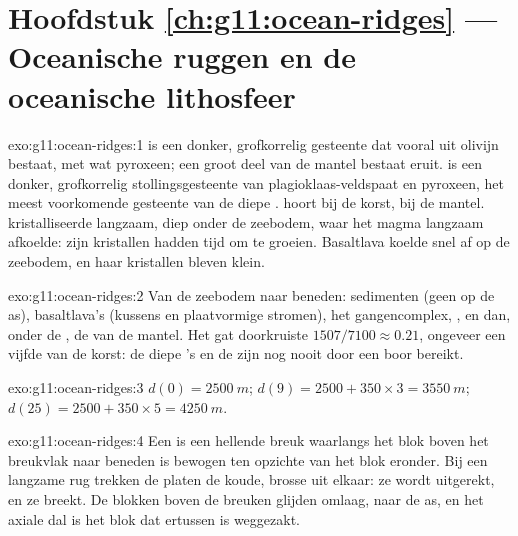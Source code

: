 \section*{Hoofdstuk \ref{ch:g11:ocean-ridges} --- Oceanische ruggen en de oceanische lithosfeer}

\begin{solution}{exo:g11:ocean-ridges:1}
 is een donker, grofkorrelig gesteente dat vooral uit olivijn bestaat, met
wat pyroxeen; een groot deel van de mantel bestaat eruit.  is een donker,
grofkorrelig stollingsgesteente van plagioklaas-veldspaat en pyroxeen, het meest
voorkomende gesteente van de diepe .  hoort bij de korst,
 bij de mantel.  kristalliseerde langzaam, diep onder de zeebodem,
waar het magma langzaam afkoelde: zijn kristallen hadden tijd om te groeien.
Basaltlava koelde snel af op de zeebodem, en haar kristallen bleven klein.
\end{solution}

\begin{solution}{exo:g11:ocean-ridges:2}
Van de zeebodem naar beneden: sedimenten (geen op de as), basaltlava's (kussens
en plaatvormige stromen), het gangencomplex, , en dan, onder de , de
 van de mantel. Het gat doorkruiste $1507/7100 \approx 0.21$, ongeveer
een vijfde van de korst: de diepe 's en de  zijn nog nooit door een boor
bereikt.
\end{solution}

\begin{solution}{exo:g11:ocean-ridges:3}
$d(0) = \qty{2500}{m}$; $d(9) = 2500 + 350 \times 3 = \qty{3550}{m}$;
$d(25) = 2500 + 350 \times 5 = \qty{4250}{m}$.
\end{solution}

\begin{solution}{exo:g11:ocean-ridges:4}
Een  is een hellende breuk waarlangs het blok boven het breukvlak
naar beneden is bewogen ten opzichte van het blok eronder. Bij een langzame rug
trekken de platen de koude, brosse  uit elkaar: ze wordt uitgerekt, en
ze breekt. De blokken boven de breuken glijden omlaag, naar de as, en het axiale
dal is het blok dat ertussen is weggezakt.
\end{solution}

